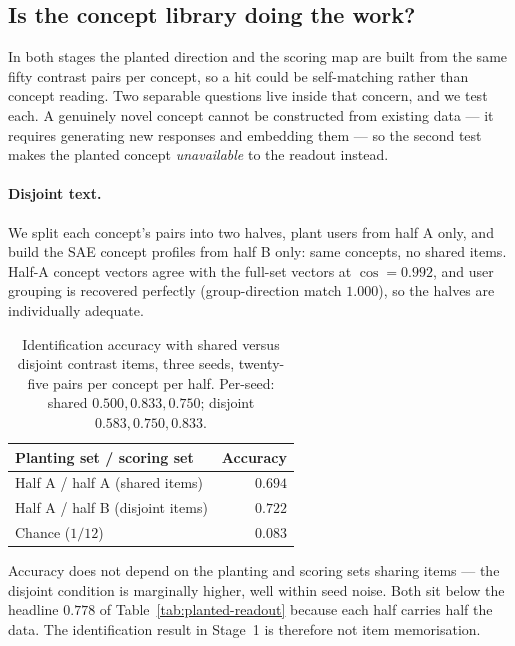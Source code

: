 \subsection{Is the concept library doing the work?}
\label{sec:planted-circularity}

In both stages the planted direction and the scoring map are built from the same
fifty contrast pairs per concept, so a hit could be self-matching rather than
concept reading. Two separable questions live inside that concern, and we test
each. A genuinely novel concept cannot be constructed from existing data --- it
requires generating new responses and embedding them --- so the second test
makes the planted concept \emph{unavailable} to the readout instead.

\paragraph{Disjoint text.} We split each concept's pairs into two halves, plant
users from half A only, and build the SAE concept profiles from half B only:
same concepts, no shared items. Half-A concept vectors agree with the full-set
vectors at $\cos = 0.992$, and user grouping is recovered perfectly
(group-direction match $1.000$), so the halves are individually adequate.

\begin{table}[h]
\centering
\begin{tabular}{lr}
\toprule
Planting set / scoring set & Accuracy \\
\midrule
Half A / half A (shared items)   & $0.694$ \\
Half A / half B (disjoint items) & $0.722$ \\
\midrule
Chance ($1/12$)                  & $0.083$ \\
\bottomrule
\end{tabular}
\caption{Identification accuracy with shared versus disjoint contrast items,
three seeds, twenty-five pairs per concept per half. Per-seed: shared $0.500,
0.833, 0.750$; disjoint $0.583, 0.750, 0.833$.}
\label{tab:planted-disjoint}
\end{table}

Accuracy does not depend on the planting and scoring sets sharing items --- the
disjoint condition is marginally higher, well within seed noise. Both sit below
the headline $0.778$ of Table~\ref{tab:planted-readout} because each half
carries half the data. The identification result in Stage~1 is therefore not
item memorisation.

